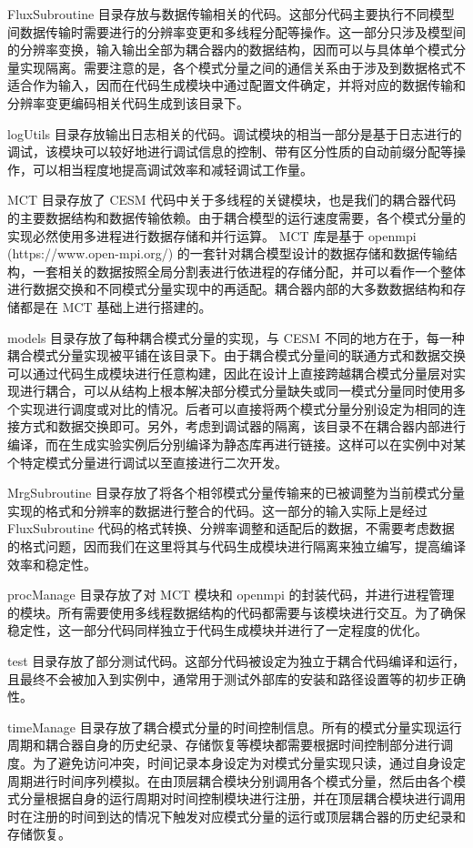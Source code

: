 FluxSubroutine 目录存放与数据传输相关的代码。这部分代码主要执行不同模型间数据传输时需要进行的分辨率变更和多线程分配等操作。这一部分只涉及模型间的分辨率变换，输入输出全部为耦合器内的数据结构，因而可以与具体单个模式分量实现隔离。需要注意的是，各个模式分量之间的通信关系由于涉及到数据格式不适合作为输入，因而在代码生成模块中通过配置文件确定，并将对应的数据传输和分辨率变更编码相关代码生成到该目录下。

logUtils 目录存放输出日志相关的代码。调试模块的相当一部分是基于日志进行的调试，该模块可以较好地进行调试信息的控制、带有区分性质的自动前缀分配等操作，可以相当程度地提高调试效率和减轻调试工作量。

MCT 目录存放了 CESM 代码中关于多线程的关键模块，也是我们的耦合器代码的主要数据结构和数据传输依赖。由于耦合模型的运行速度需要，各个模式分量的实现必然使用多进程进行数据存储和并行运算。 MCT 库是基于 openmpi (https://www.open-mpi.org/) 的一套针对耦合模型设计的数据存储和数据传输结构，一套相关的数据按照全局分割表进行依进程的存储分配，并可以看作一个整体进行数据交换和不同模式分量实现中的再适配。耦合器内部的大多数数据结构和存储都是在 MCT 基础上进行搭建的。

models 目录存放了每种耦合模式分量的实现，与 CESM 不同的地方在于，每一种耦合模式分量实现被平铺在该目录下。由于耦合模式分量间的联通方式和数据交换可以通过代码生成模块进行任意构建，因此在设计上直接跨越耦合模式分量层对实现进行耦合，可以从结构上根本解决部分模式分量缺失或同一模式分量同时使用多个实现进行调度或对比的情况。后者可以直接将两个模式分量分别设定为相同的连接方式和数据交换即可。另外，考虑到调试器的隔离，该目录不在耦合器内部进行编译，而在生成实验实例后分别编译为静态库再进行链接。这样可以在实例中对某个特定模式分量进行调试以至直接进行二次开发。

MrgSubroutine 目录存放了将各个相邻模式分量传输来的已被调整为当前模式分量实现的格式和分辨率的数据进行整合的代码。这一部分的输入实际上是经过 FluxSubroutine 代码的格式转换、分辨率调整和适配后的数据，不需要考虑数据的格式问题，因而我们在这里将其与代码生成模块进行隔离来独立编写，提高编译效率和稳定性。

procManage 目录存放了对 MCT 模块和 openmpi 的封装代码，并进行进程管理的模块。所有需要使用多线程数据结构的代码都需要与该模块进行交互。为了确保稳定性，这一部分代码同样独立于代码生成模块并进行了一定程度的优化。

test 目录存放了部分测试代码。这部分代码被设定为独立于耦合代码编译和运行，且最终不会被加入到实例中，通常用于测试外部库的安装和路径设置等的初步正确性。

timeManage 目录存放了耦合模式分量的时间控制信息。所有的模式分量实现运行周期和耦合器自身的历史纪录、存储恢复等模块都需要根据时间控制部分进行调度。为了避免访问冲突，时间记录本身设定为对模式分量实现只读，通过自身设定周期进行时间序列模拟。在由顶层耦合模块分别调用各个模式分量，然后由各个模式分量根据自身的运行周期对时间控制模块进行注册，并在顶层耦合模块进行调用时在注册的时间到达的情况下触发对应模式分量的运行或顶层耦合器的历史纪录和存储恢复。

